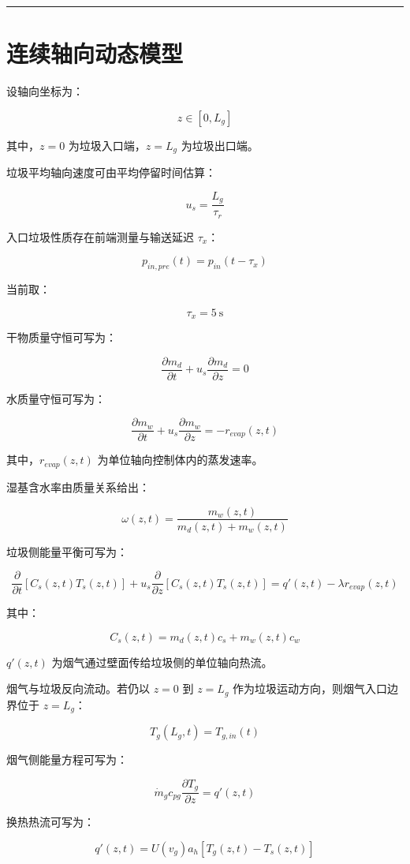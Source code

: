 \documentclass[UTF8,openany,zihao=-4,oneside]{ctexbook}
\newcommand{\manualdivider}{\par\vspace{0.6em}\noindent\textcolor{FGLine}{\rule{\linewidth}{0.7pt}}\vspace{0.6em}\par}
\begin{document}
\manualdivider

\section{连续轴向动态模型}\label{ux8fdeux7eedux8f74ux5411ux52a8ux6001ux6a21ux578b}

设轴向坐标为：

\[
z\in[0,L_g]
\]

其中，\(z=0\) 为垃圾入口端，\(z=L_g\) 为垃圾出口端。

垃圾平均轴向速度可由平均停留时间估算：

\[
u_s=\frac{L_g}{\tau_r}
\]

入口垃圾性质存在前端测量与输送延迟 \(\tau_x\)：

\[
p_{in,pre}(t)=p_{in}(t-\tau_x)
\]

当前取：

\[
\tau_x=5\ \mathrm{s}
\]

干物质量守恒可写为：

\[
\frac{\partial m_d}{\partial t}+u_s\frac{\partial m_d}{\partial z}=0
\]

水质量守恒可写为：

\[
\frac{\partial m_w}{\partial t}+u_s\frac{\partial m_w}{\partial z}=-r_{evap}(z,t)
\]

其中，\(r_{evap}(z,t)\) 为单位轴向控制体内的蒸发速率。

湿基含水率由质量关系给出：

\[
\omega(z,t)=\frac{m_w(z,t)}{m_d(z,t)+m_w(z,t)}
\]

垃圾侧能量平衡可写为：

\[
\frac{\partial}{\partial t}\left[C_s(z,t)T_s(z,t)\right]
+u_s\frac{\partial}{\partial z}\left[C_s(z,t)T_s(z,t)\right]
=q'(z,t)-\lambda r_{evap}(z,t)
\]

其中：

\[
C_s(z,t)=m_d(z,t)c_s+m_w(z,t)c_w
\]

\(q'(z,t)\) 为烟气通过壁面传给垃圾侧的单位轴向热流。

烟气与垃圾反向流动。若仍以 \(z=0\) 到 \(z=L_g\) 作为垃圾运动方向，则烟气入口边界位于 \(z=L_g\)：

\[
T_g(L_g,t)=T_{g,in}(t)
\]

烟气侧能量方程可写为：

\[
\dot m_g c_{pg}\frac{\partial T_g}{\partial z}=q'(z,t)
\]

换热热流可写为：

\[
q'(z,t)=U(v_g)a_h\left[T_g(z,t)-T_s(z,t)\right]
\]
\end{document}
